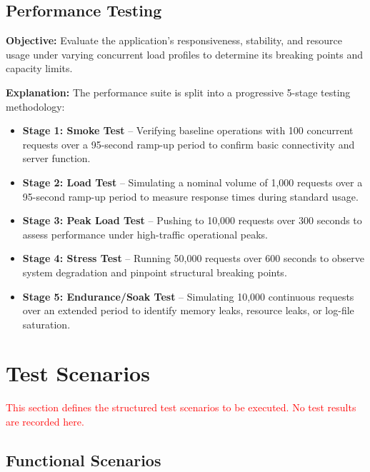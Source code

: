 \documentclass[12pt,a4paper]{article}
\newcommand{\important}[1]{\textcolor{red}{#1}} %
\begin{document}
\subsection{Performance Testing}

\textbf{Objective:}
Evaluate the application's responsiveness, stability, and resource usage under varying concurrent load profiles to determine its breaking points and capacity limits.

\textbf{Explanation:}
The performance suite is split into a progressive 5-stage testing methodology:
\begin{itemize}
\item \textbf{Stage 1: Smoke Test} – Verifying baseline operations with 100 concurrent requests over a 95-second ramp-up period to confirm basic connectivity and server function.
\item \textbf{Stage 2: Load Test} – Simulating a nominal volume of 1,000 requests over a 95-second ramp-up period to measure response times during standard usage.
\item \textbf{Stage 3: Peak Load Test} – Pushing to 10,000 requests over 300 seconds to assess performance under high-traffic operational peaks.
\item \textbf{Stage 4: Stress Test} – Running 50,000 requests over 600 seconds to observe system degradation and pinpoint structural breaking points.
\item \textbf{Stage 5: Endurance/Soak Test} – Simulating 10,000 continuous requests over an extended period to identify memory leaks, resource leaks, or log-file saturation.
\end{itemize}

\newpage

\section{Test Scenarios}

\important{This section defines the structured test scenarios to be executed. No test results are recorded here.}

\subsection{Functional Scenarios}
\end{document}
